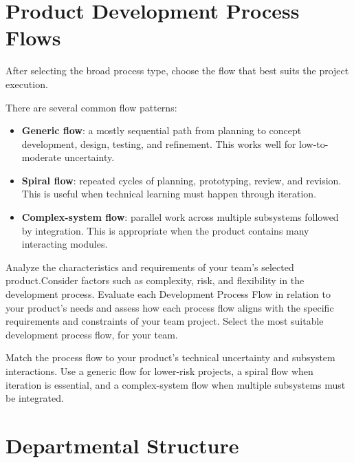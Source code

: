 




\section{Product Development Process Flows}

After selecting the broad process type, choose the flow that best suits the project execution.

There are several common flow patterns:
\begin{itemize}
    \item \textbf{Generic flow}: a mostly sequential path from planning to concept development, design, testing, and refinement. This works well for low-to-moderate uncertainty.
    \item \textbf{Spiral flow}: repeated cycles of planning, prototyping, review, and revision. This is useful when technical learning must happen through iteration.
    \item \textbf{Complex-system flow}: parallel work across multiple subsystems followed by integration. This is appropriate when the product contains many interacting modules.
\end{itemize}

Analyze the characteristics and requirements of your team's selected product.Consider factors such as complexity, risk, and flexibility in the development process. Evaluate each Development Process Flow in relation to your product's needs and assess how each process flow aligns with the specific requirements and constraints of your team project.  Select the most suitable development process flow, for your team.

\begin{tcolorbox}[title=Hint]
Match the process flow to your product's technical uncertainty and subsystem interactions. Use a generic flow for lower-risk projects, a spiral flow when iteration is essential, and a complex-system flow when multiple subsystems must be integrated.
\end{tcolorbox}



\section{Departmental Structure}

